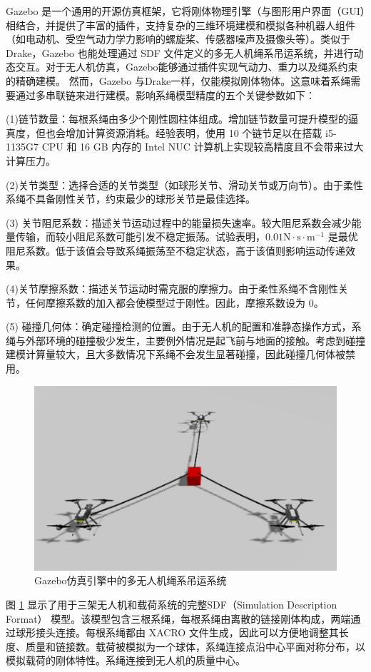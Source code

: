 \documentclass[lang=chs, degree=master, blindreview=false, winfonts=true]{yanputhesis}
\begin{document}
Gazebo 是一个通用的开源仿真框架，它将刚体物理引擎（与图形用户界面（GUI）相结合，并提供了丰富的插件，支持复杂的三维环境建模和模拟各种机器人组件（如电动机、受空气动力学力影响的螺旋桨、传感器噪声及摄像头等）。类似于 Drake，Gazebo 也能处理通过 SDF 文件定义的多无人机绳系吊运系统，并进行动态交互。对于无人机仿真，Gazebo能够通过插件实现气动力、重力以及绳系约束的精确建模。
然而，Gazebo 与Drake一样，仅能模拟刚体物体。这意味着系绳需要通过多串联链来进行建模。影响系绳模型精度的五个关键参数如下：

(1){链节数量}：每根系绳由多少个刚性圆柱体组成。增加链节数量可提升模型的逼真度，但也会增加计算资源消耗。经验表明，使用 10 个链节足以在搭载 i5-1135G7 CPU 和 16 GB 内存的 Intel NUC 计算机上实现较高精度且不会带来过大计算压力。
    
(2){关节类型}：选择合适的关节类型（如球形关节、滑动关节或万向节）。由于柔性系绳不具备刚性关节，约束最少的球形关节是最佳选择。
    
(3) {关节阻尼系数}：描述关节运动过程中的能量损失速率。较大阻尼系数会减少能量传输，而较小阻尼系数可能引发不稳定振荡。试验表明，$0.01 \text {N}\cdot \text{s} \cdot \text{m}^{-1}$ 是最优阻尼系数。低于该值会导致系绳振荡至不稳定状态，高于该值则影响运动传递效果。
    
(4){关节摩擦系数}：描述关节运动时需克服的摩擦力。由于柔性系绳不含刚性关节，任何摩擦系数的加入都会使模型过于刚性。因此，摩擦系数设为 0。
    
(5) {碰撞几何体}：确定碰撞检测的位置。由于无人机的配置和准静态操作方式，系绳与外部环境的碰撞极少发生，主要例外情况是起飞前与地面的接触。考虑到碰撞建模计算量较大，且大多数情况下系绳不会发生显著碰撞，因此碰撞几何体被禁用。

\begin{figure}[hbt!]
	\centering
	\includegraphics[width=36pc]{picture/5_2.png} 
	\caption{Gazebo仿真引擎中的多无人机绳系吊运系统} 
	\label{5_2}
\end{figure}
图 \ref{5_2} 显示了用于三架无人机和载荷系统的完整SDF（Simulation Description Format） 模型。该模型包含三根系绳，每根系绳由离散的链接刚体构成，两端通过球形接头连接。每根系绳都由 XACRO 文件生成，因此可以方便地调整其长度、质量和链接数。载荷被模拟为一个球体，系绳连接点沿中心平面对称分布，以模拟载荷的刚体特性。系绳连接到无人机的质量中心。
\end{document}
